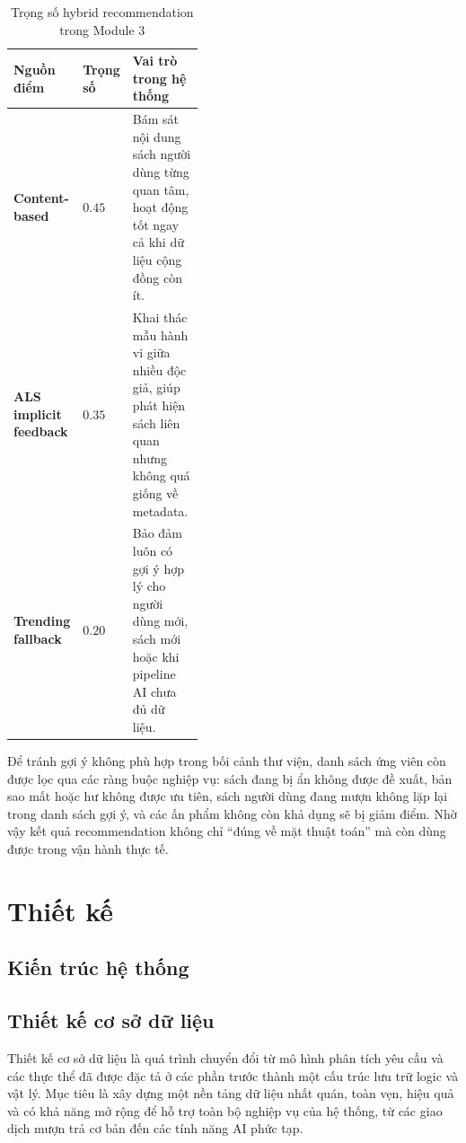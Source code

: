 \begin{table}[H]
\centering
\small
\renewcommand{\arraystretch}{1.15}
\setlength{\tabcolsep}{4pt}
\begin{tabularx}{\linewidth}{|>{\bfseries}p{0.24\linewidth}|>{\raggedright\arraybackslash}p{0.18\linewidth}|>{\raggedright\arraybackslash}X|}
\hline
\textbf{Nguồn điểm} & \textbf{Trọng số} & \textbf{Vai trò trong hệ thống} \\
\hline
Content-based & $0.45$ & Bám sát nội dung sách người dùng từng quan tâm, hoạt động tốt ngay cả khi dữ liệu cộng đồng còn ít. \\
\hline
ALS implicit feedback & $0.35$ & Khai thác mẫu hành vi giữa nhiều độc giả, giúp phát hiện sách liên quan nhưng không quá giống về metadata. \\
\hline
Trending fallback & $0.20$ & Bảo đảm luôn có gợi ý hợp lý cho người dùng mới, sách mới hoặc khi pipeline AI chưa đủ dữ liệu. \\
\hline
\end{tabularx}
\caption{Trọng số hybrid recommendation trong Module 3}
\label{tab:recommendation_weights}
\end{table}

Để tránh gợi ý không phù hợp trong bối cảnh thư viện, danh sách ứng viên còn được
lọc qua các ràng buộc nghiệp vụ: sách đang bị ẩn không được đề xuất, bản sao mất
hoặc hư không được ưu tiên, sách người dùng đang mượn không lặp lại trong danh
sách gợi ý, và các ấn phẩm không còn khả dụng sẽ bị giảm điểm. Nhờ vậy kết quả
recommendation không chỉ ``đúng về mặt thuật toán'' mà còn dùng được trong vận
hành thực tế.

\section{Thiết kế}
\subsection{Kiến trúc hệ thống}
\label{subsec:system-architecture}
\subsection{Thiết kế cơ sở dữ liệu}
\label{subsec:database-design}

Thiết kế cơ sở dữ liệu là quá trình chuyển đổi từ mô hình phân tích yêu cầu và các thực thể đã được đặc tả ở các phần trước thành một cấu trúc lưu trữ logic và vật lý. Mục tiêu là xây dựng một nền tảng dữ liệu nhất quán, toàn vẹn, hiệu quả và có khả năng mở rộng để hỗ trợ toàn bộ nghiệp vụ của hệ thống, từ các giao dịch mượn trả cơ bản đến các tính năng AI phức tạp.


